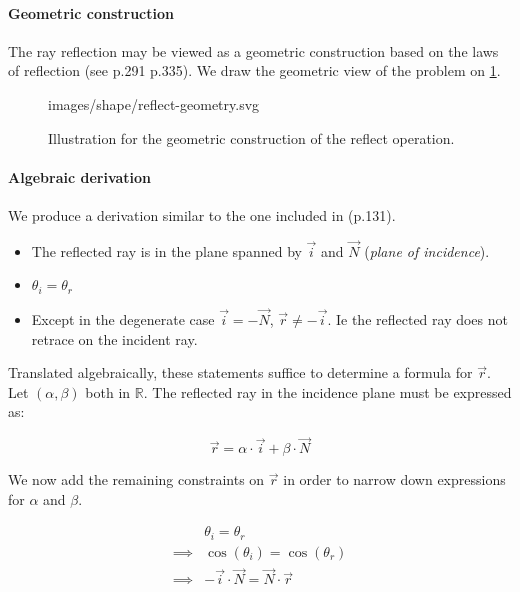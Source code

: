 \paragraph{Geometric construction}
The ray reflection may be viewed as a geometric construction based on the
laws of reflection (see \cite{Glassner:1989} p.291 \cite{Comninos:2010}
p.335). We draw the geometric view of the problem on
\cref{fig:reflect-geometry}.

\begin{figure} \caption{\label{fig:reflect-geometry} Illustration for the
geometric construction of the reflect operation.}

           {images/shape/reflect-geometry.svg}
\end{figure}

\paragraph{Algebraic derivation}
We produce a derivation similar to the one included in \cite{Glassner:1989}
(p.131).

\begin{itemize}
\item The reflected ray is in the plane spanned by $\overrightarrow{i}$ and
      $\overrightarrow{N}$ (\emph{plane of incidence}).
\item $\theta_i = \theta_r$
\item Except in the degenerate case $\overrightarrow{i} = - \overrightarrow{N}$,
$\overrightarrow{r} \neq - \overrightarrow{i}$. Ie the reflected ray does not
retrace on the incident ray.
\end{itemize}

Translated algebraically, these statements suffice to determine a formula for
$\overrightarrow{r}$. Let $(\alpha, \beta)$ both in $\mathbb{R}$. The reflected
ray in the incidence plane must be expressed as:

\begin{equation}
\overrightarrow{r} = \alpha \cdot \overrightarrow{i} +
                     \beta \cdot \overrightarrow{N}
\end{equation}

We now add the remaining constraints on $\overrightarrow{r}$ in order to narrow
down expressions for $\alpha$ and $\beta$.

\begin{equation} \begin{split}
& \theta_i = \theta_r \\
\implies & \cos(\theta_i) = \cos(\theta_r) \\
\implies & - \overrightarrow{i} \cdot \overrightarrow{N} =
       \overrightarrow{N} \cdot \overrightarrow{r}
\end{split} \end{equation}

